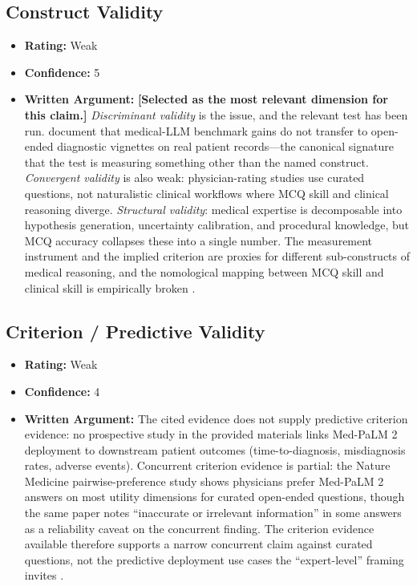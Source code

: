 \subsection{Construct Validity}
\begin{itemize}
    \item \textbf{Rating:} Weak
    \item \textbf{Confidence:} 5
    \item \textbf{Written Argument:} \textbf{[Selected as the most relevant dimension for this claim.]} \emph{Discriminant validity} is the issue, and the relevant test has been run. \citet{alaa2025medical} document that medical-LLM benchmark gains do not transfer to open-ended diagnostic vignettes on real patient records---the canonical signature that the test is measuring something other than the named construct. \emph{Convergent validity} is also weak: physician-rating studies \citep{singhal2025nature} use curated questions, not naturalistic clinical workflows where MCQ skill and clinical reasoning diverge. \emph{Structural validity}: medical expertise is decomposable into hypothesis generation, uncertainty calibration, and procedural knowledge, but MCQ accuracy collapses these into a single number. The measurement instrument and the implied criterion are proxies for different sub-constructs of medical reasoning, and the nomological mapping between MCQ skill and clinical skill is empirically broken \citep{salaudeen2025measurement}.
\end{itemize}

\subsection{Criterion / Predictive Validity}
\begin{itemize}
    \item \textbf{Rating:} Weak
    \item \textbf{Confidence:} 4
    \item \textbf{Written Argument:} The cited evidence does not supply predictive criterion evidence: no prospective study in the provided materials links Med-PaLM 2 deployment to downstream patient outcomes (time-to-diagnosis, misdiagnosis rates, adverse events). Concurrent criterion evidence is partial: the Nature Medicine pairwise-preference study \citep{singhal2025nature} shows physicians prefer Med-PaLM 2 answers on most utility dimensions for curated open-ended questions, though the same paper notes ``inaccurate or irrelevant information'' in some answers as a reliability caveat on the concurrent finding. The criterion evidence available therefore supports a narrow concurrent claim against curated questions, not the predictive deployment use cases the ``expert-level'' framing invites \citep{salaudeen2025measurement}.
\end{itemize}

